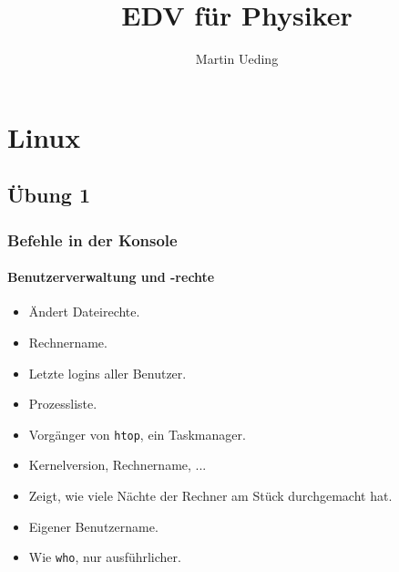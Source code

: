 \documentclass[12pt]{report}
\title{EDV für Physiker}
\author{Martin Ueding}
\newcommand\dd[2]{\item[\texttt{#1}] #2}
\begin{document}
\maketitle
\newpage

\tableofcontents
\newpage


\part{Linux}

\chapter{Übung 1}

\section{Befehle in der Konsole}
\label{commands}

\subsection{Benutzerverwaltung und -rechte}
\begin{itemize}
\dd{chmod}{Ändert Dateirechte.}
\dd{hostname}{Rechnername.}
\dd{last}{Letzte logins aller Benutzer.}
\dd{ps}{Prozessliste.}
\dd{top}{Vorgänger von \texttt{htop}, ein Taskmanager.}
\dd{uname}{Kernelversion, Rechnername, ...}
\dd{uptime}{Zeigt, wie viele Nächte der Rechner am Stück durchgemacht hat.}
\dd{whoami}{Eigener Benutzername.}
\dd{w}{Wie \texttt{who}, nur ausführlicher.}
\end{itemize}
\end{document}
